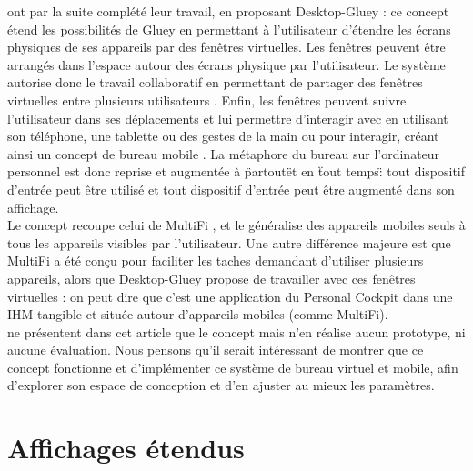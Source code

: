 
\citet{Serrano2015a} ont par la suite complété leur travail, en proposant Desktop-Gluey : ce concept étend les possibilités de Gluey en permettant à l'utilisateur d'étendre les écrans physiques de ses appareils par des fenêtres virtuelles. Les fenêtres peuvent être arrangés dans l'espace autour des écrans physique par l'utilisateur. Le système autorise donc le travail collaboratif en permettant de partager des fenêtres virtuelles entre plusieurs utilisateurs . Enfin, les fenêtres peuvent suivre l'utilisateur dans ses déplacements et lui permettre d'interagir avec en utilisant son téléphone, une tablette ou des gestes de la main ou pour interagir, créant ainsi un concept de bureau mobile . La métaphore du bureau sur l'ordinateur personnel est donc reprise et augmentée à \"partout\" et en \"tout temps\" : tout dispositif d'entrée peut être utilisé et tout dispositif d'entrée peut être augmenté dans son affichage.\\
Le concept recoupe celui de MultiFi \citep{Grubert2015}, et le généralise des appareils mobiles seuls à tous les appareils visibles par l'utilisateur. Une autre différence majeure est que MultiFi a été conçu pour faciliter les taches demandant d'utiliser plusieurs appareils, alors que Desktop-Gluey propose de travailler avec ces fenêtres virtuelles : on peut dire que c'est une application du Personal Cockpit \citep{EnsFinneganIrani2014} dans une IHM tangible et située autour d'appareils mobiles (comme MultiFi).\\
\citeauthor{Serrano2015a} ne présentent dans cet article que le concept mais n'en réalise aucun prototype, ni aucune évaluation. Nous pensons qu'il serait intéressant de montrer que ce concept fonctionne et d'implémenter ce système de bureau virtuel et mobile, afin d'explorer son espace de conception et d'en ajuster au mieux les paramètres.



\section{Affichages étendus}
